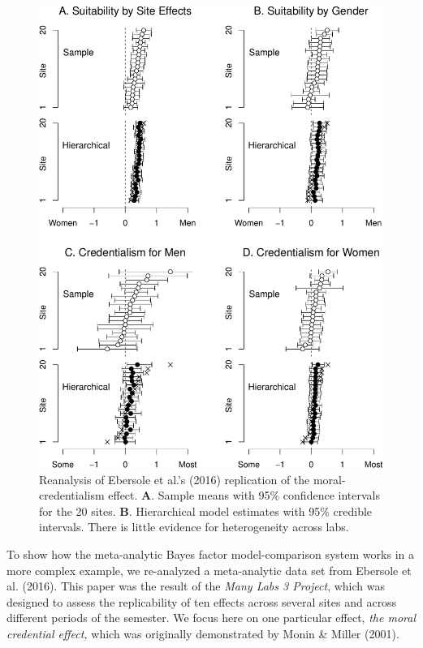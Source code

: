 \documentclass[english,man]{apa6}
\theoremstyle{definition}
\theoremstyle{definition}
\theoremstyle{remark}
\begin{document}
\begin{figure}[htbp]
\centering
\includegraphics{pBlind_files/figure-latex/ml3Est-1.pdf}
\caption{\label{fig:ml3Est}Reanalysis of Ebersole et al.'s (2016)
replication of the moral-credentialism effect. \textbf{A}. Sample means
with 95\% confidence intervals for the 20 sites. \textbf{B}.
Hierarchical model estimates with 95\% credible intervals. There is
little evidence for heterogeneity across labs.}
\end{figure}

To show how the meta-analytic Bayes factor model-comparison system works
in a more complex example, we re-analyzed a meta-analytic data set from
Ebersole et al. (2016). This paper was the result of the \emph{Many Labs
3 Project}, which was designed to assess the replicability of ten
effects across several sites and across different periods of the
semester. We focus here on one particular effect, \emph{the moral
credential effect,} which was originally demonstrated by Monin \& Miller
(2001).
\end{document}
